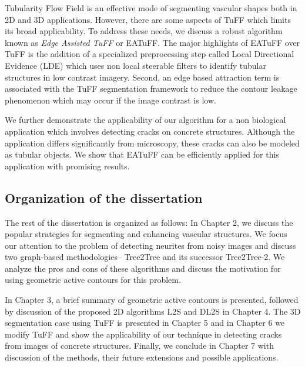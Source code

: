 Tubularity Flow Field is an effective mode of segmenting vascular shapes both in 2D and 3D applications. However, there are some aspects of TuFF which limits its broad applicability. To address these needs, we discuss a robust algorithm known as \textit{Edge Assisted TuFF} or EATuFF. The major highlights of EATuFF over TuFF is the addition of a specialized preprocessing step called Local Directional Evidence (LDE) which uses non local steerable filters to identify tubular structures in low contrast imagery. Second, an edge based attraction term is associated with the TuFF segmentation framework to reduce the contour leakage phenomenon which may occur if the image contrast is low. 

We further demonstrate the applicability of our algorithm for a non biological application which involves detecting cracks on concrete structures. Although the application differs significantly from microscopy, these cracks can also be modeled as tubular objects. We show that EATuFF can be efficiently applied for this application with promising results.

\subsection{Organization of the dissertation}
The rest of the dissertation is organized as follows: In Chapter 2, we discuss the  popular strategies for segmenting and enhancing vascular structures. We focus our attention to the problem of detecting neurites from noisy images and discuss two graph-based methodologies-- Tree2Tree and its successor Tree2Tree-2. We analyze the pros and cons of these algorithms and discuss the motivation for using geometric active contours for this problem.

In Chapter 3, a brief summary of geometric active contours is presented, followed by discussion of the proposed 2D algorithms L2S and DL2S in Chapter 4. The 3D segmentation case using TuFF is presented in Chapter 5 and in Chapter 6 we modify TuFF and show the applicability of our technique in detecting cracks from images of concrete structures. Finally, we conclude in Chapter 7 with discussion of the methods, their future extensions and possible applications.